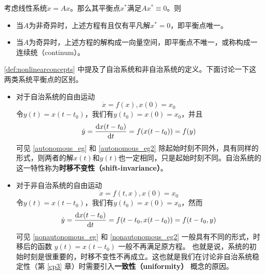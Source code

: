 \begin{example}[线性系统的平衡点]
  考虑线性系统$\dot{x}=Ax$。那么其平衡点$x^\ast$满足$Ax^\ast\equiv 0$。则
  \begin{itemize}[leftmargin=1em]
    \item 当$A$为非奇异时，上述方程有且仅有平凡解$x^\ast=0$，即平衡点唯一。
    \item 当$A$为奇异时，上述方程的解构成一向量空间，即平衡点不唯一，或称构成一连续统（continum）。
  \end{itemize}
\end{example}

\ref{def:nonlinearconcepts} 中提及了自治系统和非自治系统的定义。下面讨论一下这两类系统平衡点的区别。
\begin{itemize}[leftmargin=2em]
  \item 对于自治系统的自由运动\begin{equation}\label{autonomous_eg}
    \dot{x}=f(x),x(0)=x_0
  \end{equation}
  令$y(t)=x(t-t_0)$，我们有$y(t_0)=x(0)=x_0$，并且\begin{equation}\label{autonomous_eg2}
    \dot{y}=\frac{\mathop{}\!\mathrm{d} x(t-t_0)}{\mathop{}\!\mathrm{d} t}=f(x(t-t_0))=f(y)
  \end{equation}
  可见 \eqref{autonomous_eg} 和 \eqref{autonomous_eg2} 除起始时刻不同外，具有同样的形式，则两者的解$x(t)$和$y(t)$也一定相同，只是起始时刻不同。自治系统的这一特性称为{\bf 时移不变性（shift-invariance）}。
  \item 对于非自治系统的自由运动\begin{equation}\label{nonautonomous_eg}
    \dot{x}=f(t,x),x(0)=x_0
  \end{equation}
  令$y(t)=x(t-t_0)$，我们有$y(t_0)=x(0)=x_0$，然而\begin{equation}\label{nonautonomous_eg2}
    \dot{y}=\frac{\mathop{}\!\mathrm{d} x(t-t_0)}{\mathop{}\!\mathrm{d} t}=f(t-t_0,x(t-t_0))=f(t-t_0,y)
  \end{equation}
  可见 \eqref{nonautonomous_eg} 和 \eqref{nonautonomous_eg2} 一般具有不同的形式，时移后的函数 \(y(t)=x(t-t_0)\) 一般不再满足原方程。
  也就是说，系统的初始时刻是很重要的，时移不变性不再成立。这也就是我们在讨论非自治系统稳定性（第 \ref{cp3} 章）时需要引入{\bf 一致性（uniformity）}
  概念的原因。
\end{itemize}
